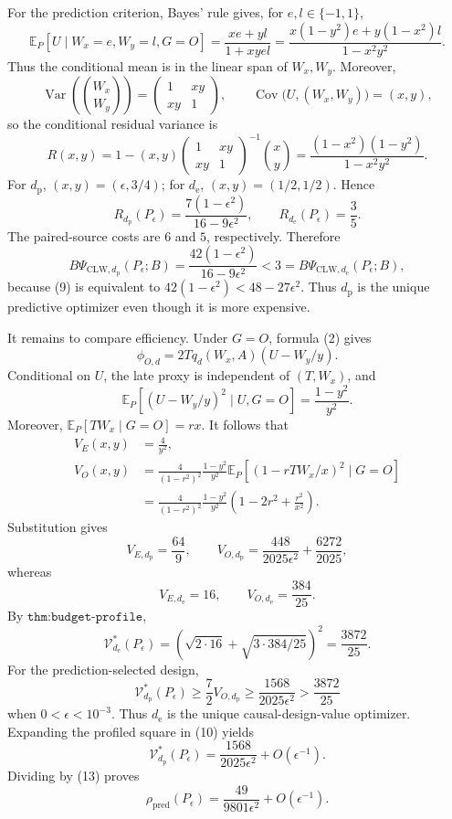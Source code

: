 For the prediction criterion, Bayes' rule gives, for \(e,l\in\{-1,1\}\),
\[
 \mathbb E_P[U\mid W_x=e,W_y=l,G=O]
 =\frac{xe+yl}{1+xyel}
 =\frac{x(1-y^2)e+y(1-x^2)l}{1-x^2y^2}. \tag{6}
\]
Thus the conditional mean is in the linear span of \(W_x,W_y\).  Moreover,
\[
 \operatorname{Var}\!\left(\binom{W_x}{W_y}\right)
 =\begin{pmatrix}1&xy\\xy&1\end{pmatrix},
 \qquad
 \operatorname{Cov}\bigl(U,(W_x,W_y)\bigr)=(x,y),
\]
so the conditional residual variance is
\[
 R(x,y)
 =1-(x,y)
 \begin{pmatrix}1&xy\\xy&1\end{pmatrix}^{-1}
 \binom{x}{y}
 =\frac{(1-x^2)(1-y^2)}{1-x^2y^2}. \tag{7}
\]
For \(d_{\mathrm p}\), \((x,y)=(\epsilon,3/4)\); for \(d_{\mathrm e}\), \((x,y)=(1/2,1/2)\).  Hence
\[
 R_{d_{\mathrm p}}(P_\epsilon)
 =\frac{7(1-\epsilon^2)}{16-9\epsilon^2},
 \qquad
 R_{d_{\mathrm e}}(P_\epsilon)=\frac35. \tag{8}
\]
The paired-source costs are \(6\) and \(5\), respectively.  Therefore
\[
 B\Psi_{\mathrm{CLW},d_{\mathrm p}}(P_\epsilon;B)
 =\frac{42(1-\epsilon^2)}{16-9\epsilon^2}
 <3
 =B\Psi_{\mathrm{CLW},d_{\mathrm e}}(P_\epsilon;B), \tag{9}
\]
because (9) is equivalent to \(42(1-\epsilon^2)<48-27\epsilon^2\).  Thus \(d_{\mathrm p}\) is the unique predictive optimizer even though it is more expensive.

It remains to compare efficiency.  Under \(G=O\), formula (2) gives
\[
 \phi_{O,d}=2Tq_d(W_x,A)(U-W_y/y).
\]
Conditional on \(U\), the late proxy is independent of \((T,W_x)\), and
\[
 \mathbb E_P[(U-W_y/y)^2\mid U,G=O]=\frac{1-y^2}{y^2}.
\]
Moreover, \(\mathbb E_P[TW_x\mid G=O]=rx\).  It follows that
\[
 \begin{aligned}
 V_E(x,y)&=\frac4{y^2},\\
 V_O(x,y)
 &=\frac4{(1-r^2)^2}\frac{1-y^2}{y^2}
 \mathbb E_P[(1-rTW_x/x)^2\mid G=O]\\
 &=\frac4{(1-r^2)^2}\frac{1-y^2}{y^2}
 \left(1-2r^2+\frac{r^2}{x^2}\right). 
 \end{aligned} \tag{10}
\]
Substitution gives
\[
 V_{E,d_{\mathrm p}}=\frac{64}{9},
 \qquad
 V_{O,d_{\mathrm p}}
 =\frac{448}{2025\epsilon^2}+\frac{6272}{2025}, \tag{11}
\]
whereas
\[
 V_{E,d_{\mathrm e}}=16,
 \qquad
 V_{O,d_{\mathrm e}}=\frac{384}{25}. \tag{12}
\]
By \(\texttt{thm:budget-profile}\),
\[
 \mathcal V_{d_{\mathrm e}}^*(P_\epsilon)
 =\left(\sqrt{2\cdot16}+\sqrt{3\cdot384/25}\right)^2
 =\frac{3872}{25}. \tag{13}
\]
For the prediction-selected design,
\[
 \mathcal V_{d_{\mathrm p}}^*(P_\epsilon)
 \ge \frac72V_{O,d_{\mathrm p}}
 \ge\frac{1568}{2025\epsilon^2}
 >\frac{3872}{25} \tag{14}
\]
when \(0<\epsilon<10^{-3}\).  Thus \(d_{\mathrm e}\) is the unique causal-design-value optimizer.  Expanding the profiled square in (10) yields
\[
 \mathcal V_{d_{\mathrm p}}^*(P_\epsilon)
 =\frac{1568}{2025\epsilon^2}+O(\epsilon^{-1}).
\]
Dividing by (13) proves
\[
 \rho_{\mathrm{pred}}(P_\epsilon)
 =\frac{49}{9801\epsilon^2}+O(\epsilon^{-1}). \tag{15}
\]

